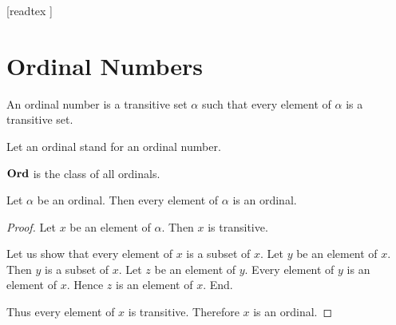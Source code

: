 \documentclass[10pt]{article}
\begin{document}
  \begin{imports}
    \begin{forthel}
      [readtex ]
    \end{forthel}
  \end{imports}


  \section*{Ordinal Numbers}

  \begin{forthel}
    \begin{definition}[id=SET_THEORY_02_229593678086144,printid]
      An ordinal number is a transitive set $\alpha$ such that every element of $\alpha$ is a transitive set.
    \end{definition}

    Let an ordinal stand for an ordinal number.
  \end{forthel}

  \begin{forthel}
    \begin{definition}[id=SET_THEORY_02_5852994258075648,printid]
      $\textbf{Ord}$ is the class of all ordinals.
    \end{definition}
  \end{forthel}

  \begin{forthel}
    \begin{proposition}[id=SET_THEORY_02_2358097091756032,printid]
      Let $\alpha$ be an ordinal.
      Then every element of $\alpha$ is an ordinal.
    \end{proposition}
    \begin{proof}
      Let $x$ be an element of $\alpha$.
      Then $x$ is transitive.

      Let us show that every element of $x$ is a subset of $x$.
        Let $y$ be an element of $x$.
        Then $y$ is a subset of $x$.
        Let $z$ be an element of $y$.
        Every element of $y$ is an element of $x$.
        Hence $z$ is an element of $x$.
      End.

      Thus every element of $x$ is transitive.
      Therefore $x$ is an ordinal.
    \end{proof}
  \end{forthel}
\end{document}
